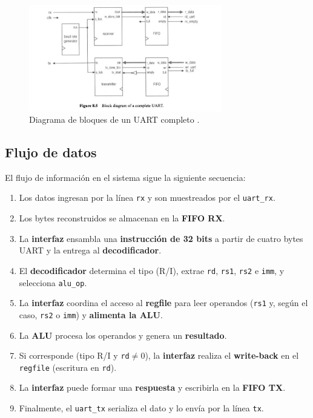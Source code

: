 \begin{figure}[H]
    \centering
    \includegraphics[width=0.75\textwidth]{img/completeUART.jpeg}
    \caption{Diagrama de bloques de un UART completo \cite{libroUART}.}
    \label{fig:uart-general}
\end{figure}

\subsection{Flujo de datos}
El flujo de información en el sistema sigue la siguiente secuencia:
\begin{enumerate}
    \item Los datos ingresan por la línea \texttt{rx} y son muestreados por el \texttt{uart\_rx}.
    \item Los bytes reconstruidos se almacenan en la \textbf{FIFO RX}.
    \item La \textbf{interfaz} ensambla una \textbf{instrucción de 32 bits} a partir de cuatro bytes UART y la entrega al \textbf{decodificador}.
    \item El \textbf{decodificador} determina el tipo (R/I), extrae \texttt{rd}, \texttt{rs1}, \texttt{rs2} e \texttt{imm}, y selecciona \texttt{alu\_op}.
    \item La \textbf{interfaz} coordina el acceso al \textbf{regfile} para leer operandos (\texttt{rs1} y, según el caso, \texttt{rs2} o \texttt{imm}) y \textbf{alimenta la ALU}.
    \item La \textbf{ALU} procesa los operandos y genera un \textbf{resultado}.
    \item Si corresponde (tipo R/I y \texttt{rd}\(\neq 0\)), la \textbf{interfaz} realiza el \textbf{write-back} en el \texttt{regfile} (escritura en \texttt{rd}).
    \item La \textbf{interfaz} puede formar una \textbf{respuesta} y escribirla en la \textbf{FIFO TX}.
    \item Finalmente, el \texttt{uart\_tx} serializa el dato y lo envía por la línea \texttt{tx}.
\end{enumerate}
